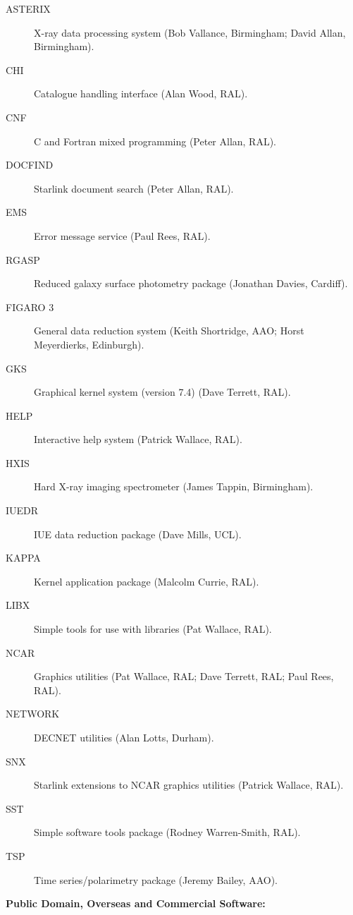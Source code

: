 \begin{description}
\item[ASTERIX] X-ray data processing system (Bob Vallance, Birmingham; 
David Allan, Birmingham).
\item[CHI] Catalogue handling interface (Alan Wood, RAL).
\item[CNF] C and Fortran mixed programming (Peter Allan, RAL).
\item[DOCFIND] Starlink document search (Peter Allan, RAL).
\item[EMS] Error message service (Paul Rees, RAL).
\item[RGASP] Reduced galaxy surface photometry package (Jonathan Davies, 
Cardiff).
\item[FIGARO 3] General data reduction system (Keith Shortridge, AAO; Horst
Meyerdierks, Edinburgh).
\item[GKS] Graphical kernel system (version 7.4) (Dave Terrett, RAL).
\item[HELP] Interactive help system (Patrick Wallace, RAL).
\item[HXIS] Hard X-ray imaging spectrometer (James Tappin, Birmingham).
\item[IUEDR] IUE data reduction package (Dave Mills, UCL).
\item[KAPPA] Kernel application package (Malcolm Currie, RAL).
\item[LIBX] Simple tools for use with libraries (Pat Wallace, RAL).
\item[NCAR] Graphics utilities (Pat Wallace, RAL; Dave Terrett, RAL; 
Paul Rees, RAL).
\item[NETWORK] DECNET utilities (Alan Lotts, Durham).
\item[SNX] Starlink extensions to NCAR graphics utilities (Patrick Wallace,
RAL).
\item[SST] Simple software tools package (Rodney Warren-Smith, RAL).
\item[TSP] Time series/polarimetry package (Jeremy Bailey, AAO).
\end{description}


\vspace{5mm}
\begin{center}
{\bf Public Domain, Overseas and Commercial Software:}
\end{center}

